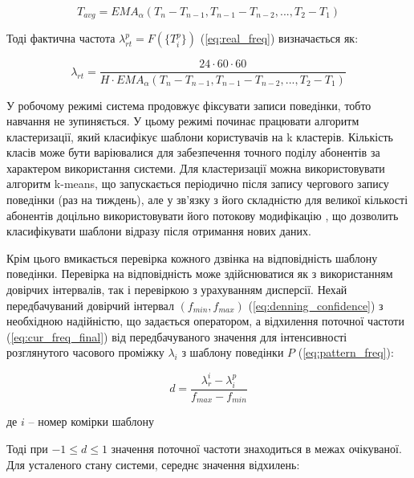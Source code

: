 \begin{equation}\label{eq:t_avg} T_{avg} = {EMA}_{\alpha}(T_n - T_{n-1}, T_{n-1} - T_{n-2}, ..., T_{2} - T_{1}) \end{equation}

Тоді фактична частота $\lambda_{rt}^p = F(\{T_i^p\})$ (\ref{eq:real_freq}) визначається як:

\begin{equation}\label{eq:cur_freq_final} \lambda_{rt} = \frac{24 \cdot 60 \cdot 60}{H \cdot {EMA}_{\alpha}(T_n - T_{n-1}, T_{n-1} - T_{n-2}, ..., T_{2} - T_{1})} \end{equation}

У робочому режимі система продовжує фіксувати записи поведінки, тобто навчання не зупиняється. У цьому режимі починає працювати алгоритм кластеризації, який класифікує шаблони користувачів на k кластерів. Кількість класів може бути варіювалися для забезпечення точного поділу абонентів за характером використання системи. Для кластеризації можна використовувати алгоритм k-means, що запускається періодично після запису чергового запису поведінки (раз на тиждень), але у зв'язку з його складністю для великої кількості абонентів доцільно використовувати його потокову модифікацію \cite{dasgupta2008clustering}, що дозволить класифікувати шаблони відразу після отримання нових даних.

Крім цього вмикається перевірка кожного дзвінка на відповідність шаблону поведінки. Перевірка на відповідність може здійснюватися як з використанням довірчих інтервалів, так і перевіркою з урахуванням дисперсії. Нехай передбачуваний довірчий інтервал $(f_{min}, f_{max})$ (\ref{eq:denning_confidence}) з необхідною надійністю, що задається оператором, а відхилення поточної частоти (\ref{eq:cur_freq_final}) від передбачуваного значення для інтенсивності розглянутого часового проміжку $\lambda_i$ з шаблону поведінки $P$ (\ref{eq:pattern_freq}):

\begin{equation}\label{eq:div} d = \frac{\lambda_r^i - \lambda_i^p}{f_{max} - f_{min}} \end{equation}
\begin{ESKDexplanation}
  \item де $i$ -- номер комірки шаблону
\end{ESKDexplanation}

Тоді при $-1 \le d \le 1$ значення поточної частоти знаходиться в межах очікуваної.
Для усталеного стану системи, середнє значення відхилень:

